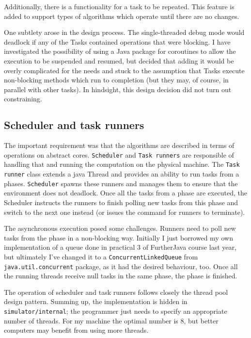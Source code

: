 \documentclass[12pt,a4paper,twoside,openright]{report}
\begin{document}
Additionally, there is a functionality for a task to be repeated. This feature is added to support types of algorithms which operate until there are no changes.

One subtlety arose in the design process. The single-threaded debug mode would deadlock if any of the Tasks contained operations that were blocking. I have investigated the possibility of using a Java package for coroutines to allow the execution to be suspended and resumed, but decided that adding it would be overly complicated for the needs and stuck to the assumption that Tasks execute non-blocking methods which run to completion (but they may, of course, in parallel with other tasks). In hindsight, this design decision did not turn out constraining.

\subsection{Scheduler and task runners}
The important requirement was that the algorithms are described in terms of operations on abstract cores. \texttt{Scheduler} and \texttt{Task runners} are responsible of handling that and running the computation on the physical machine. The \texttt{Task runner} class extends a java Thread and provides an ability to run tasks from a phases. \texttt{Scheduler} spawns these runners and manages them to ensure that the environment does not deadlock. Once all the tasks from a phase are executed, the Scheduler instructs the runners to finish polling new tasks from this phase and switch to the next one instead (or issues the command for runners to terminate).

The asynchronous execution posed some challenges. Runners need to poll new tasks from the phase in a non-blocking way. Initially I just borrowed my own implementation of a queue done in practical 3 of FurtherJava course last year, but ultimately I've changed it to a  \texttt{ConcurrentLinkedQueue} from \texttt{java.util.concurrent} package, as it had the desired behaviour, too. Once all the running threads receive null tasks in the same phase, the phase is finished.

The operation of scheduler and task runners follows closely the thread pool design pattern. Summing up, the implementation is hidden in \texttt{simulator/internal}; the programmer just needs to specify an appropriate number of threads. For my machine the optimal number is $8$, but better computers may benefit from using more threads. 
\end{document}
